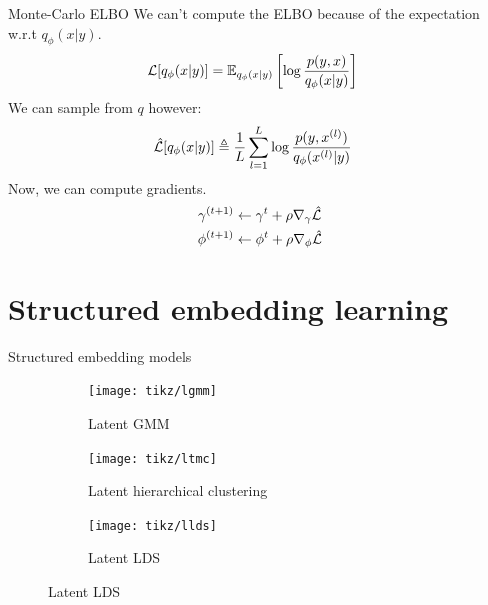 \documentclass[10pt, compress]{beamer}
\begin{document}
\begin{frame}{Monte-Carlo ELBO}
  We can't compute the ELBO because of the expectation w.r.t $q_\phi(x|y)$.
  \begin{align*}
    \mathcal{L}[q_\phi(x | y)] &= \mathbb{E}_{q_\phi(x | y)}\left[\log \frac{p(y, x)}{q_\phi(x | y)}\right]
  \end{align*}
  We can sample from $q$ however:
  \begin{align*}
    \hat{\mathcal{L}}[q_\phi(x | y)] &\triangleq \frac{1}{L}\sum_{l = 1}^L \log \frac{p(y, x^{(l)})}{q_\phi(x^{(l)} | y)}
  \end{align*}
  Now, we can compute gradients.
  \begin{align*}
    \gamma^{(t + 1)} &\leftarrow \gamma^t + \rho \nabla_\gamma \hat{\mathcal{L}} \\
    \phi^{(t + 1)} &\leftarrow \phi^t + \rho \nabla_\phi \hat{\mathcal{L}} \\
  \end{align*}
\end{frame}

\section{Structured embedding learning}

\begin{frame}{Structured embedding models}
  \begin{figure}
    \centering
    \pause
    \begin{subfigure}[t]{0.27\textwidth}
        \centering
        \texttt{[image: tikz/lgmm]}
        \caption*{Latent GMM}
    \end{subfigure}
    \pause
    \hfill
    \begin{subfigure}[t]{0.27\textwidth}
        \centering
        \texttt{[image: tikz/ltmc]}
        \caption*{Latent hierarchical clustering}
    \end{subfigure}
    \pause
    \hfill
    \begin{subfigure}[t]{0.27\textwidth}
        \centering
        \texttt{[image: tikz/llds]}
        \caption*{Latent LDS}
    \end{subfigure}
  \end{figure}
\end{frame}
\end{document}
